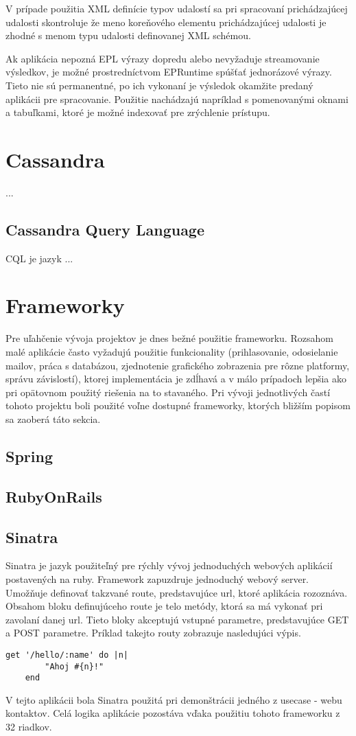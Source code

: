		V prípade použitia XML definície typov udalostí sa pri spracovaní prichádzajúcej udalosti skontroluje že meno koreňového elementu prichádzajúcej udalosti je zhodné s menom typu udalosti definovanej XML schémou.
		
		Ak aplikácia nepozná EPL výrazy dopredu alebo nevyžaduje streamovanie výsledkov, je možné prostredníctvom EPRuntime spúšťať jednorázové výrazy. Tieto nie sú permanentné, po ich vykonaní je výsledok okamžite predaný aplikácii pre spracovanie. Použitie nachádzajú napríklad s pomenovanými oknami a tabuľkami, ktoré je možné indexovať pre zrýchlenie prístupu.		

\section{Cassandra}
	...
	\subsection{Cassandra Query Language}
	\ac{CQL} je jazyk ...
	
\section{Frameworky}
	Pre uľahčenie vývoja projektov je dnes bežné použitie frameworku. Rozsahom malé aplikácie často vyžadujú použitie funkcionality (prihlasovanie, odosielanie mailov, práca s databázou, zjednotenie grafického zobrazenia pre rôzne platformy, správu závislostí), ktorej implementácia je zdĺhavá a v málo prípadoch lepšia ako pri opätovnom použitý riešenia na to stavaného. Pri vývoji jednotlivých častí tohoto projektu boli použité voľne dostupné frameworky, ktorých bližším popisom sa zaoberá táto sekcia.

	\subsection{Spring}
	
	\subsection{RubyOnRails}
	
	\subsection{Sinatra}
	Sinatra je jazyk použiteľný pre rýchly vývoj jednoduchých webových aplikácií postavených na ruby. Framework zapuzdruje jednoduchý webový server. Umožňuje definovať takzvané route, predstavujúce url, ktoré aplikácia rozoznáva. Obsahom bloku definujúceho route je telo metódy, ktorá sa má vykonať pri zavolaní danej url. Tieto bloky akceptujú vstupné parametre, predstavujúce GET a POST parametre. Príklad takejto routy zobrazuje nasledujúci výpis.
	\begin{lstlisting}[label=lst:sinatra-sampel,caption=Príklad definovania GET route vo frameworku Sinatra]
	get '/hello/:name' do |n|
		"Ahoj #{n}!"
	end
	\end{lstlisting}
	V tejto aplikácii bola Sinatra použitá pri demonštrácii jedného z usecase - webu kontaktov. Celá logika aplikácie pozostáva vďaka použitiu tohoto frameworku z 32 riadkov.

